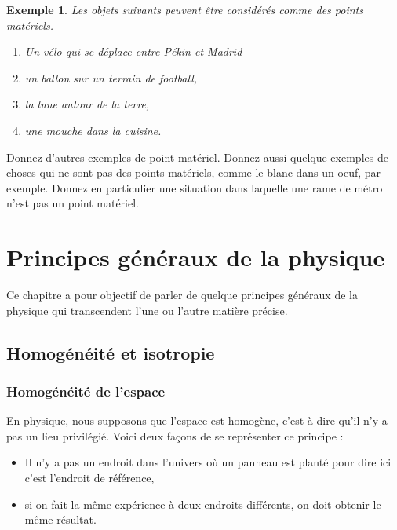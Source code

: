 \documentclass[a4paper,12pt]{book}
\theoremstyle{mes_exemples}	\newtheorem{exemple}[numtho]{Exemple}
\theoremstyle{mes_tho}
\begin{document}
\begin{exemple}
Les objets suivants peuvent être considérés comme des points matériels.
\begin{enumerate}
\item Un vélo qui se déplace entre Pékin et Madrid
\item un ballon sur un terrain de football,
\item la lune autour de la terre,
\item une mouche dans la cuisine.
\end{enumerate}
\end{exemple}

\begin{exercice}
Donnez d'autres exemples de point matériel. Donnez aussi quelque exemples de choses qui ne sont pas des points matériels, comme le blanc dans un oeuf, par exemple. Donnez en particulier une situation dans laquelle une rame de métro n'est pas un point matériel.
\end{exercice}


\chapter{Principes généraux de la physique}





Ce chapitre a pour objectif de parler de quelque principes généraux de la physique qui transcendent l'une ou l'autre matière précise.

\section{Homogénéité et isotropie}

\subsection{Homogénéité de l'espace}

En physique, nous supposons que l'espace est homogène, c'est à dire qu'il n'y a pas un lieu privilégié. Voici deux façons de se représenter ce principe :
\begin{itemize}
\item Il n'y a pas un endroit dans l'univers où un panneau est planté pour dire \og ici c'est l'endroit de référence\fg,
\item si on fait la même expérience à deux endroits différents, on doit obtenir le même résultat.
\end{itemize}
\end{document}
